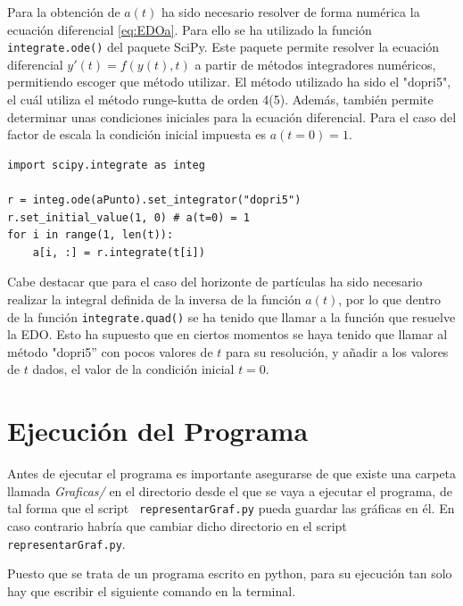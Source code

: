 \documentclass[twoside]{article}
\begin{document}
	    		Para la obtención de $a(t)$ ha sido necesario resolver de forma numérica la ecuación diferencial \ref{eq:EDOa}. Para ello se ha utilizado la función \texttt{integrate.ode()} del paquete SciPy. Este paquete permite resolver la ecuación diferencial $y'(t) = f(y(t), t)$ a partir de métodos integradores numéricos, permitiendo escoger que método utilizar. El método utilizado ha sido el "dopri5", el cuál utiliza el método runge-kutta de orden 4(5). Además, también permite determinar unas condiciones iniciales para la ecuación diferencial. Para el caso del factor de escala la condición inicial impuesta es $a(t=0) = 1$.

	    		\begin{lstlisting}[style=python]
import scipy.integrate as integ

r = integ.ode(aPunto).set_integrator("dopri5")
r.set_initial_value(1, 0) # a(t=0) = 1
for i in range(1, len(t)):
	a[i, :] = r.integrate(t[i])
				\end{lstlisting}

				Cabe destacar que para el caso del horizonte de partículas ha sido necesario realizar la integral definida de la inversa de la función $a(t)$, por lo que dentro de la función \texttt{integrate.quad()} se ha tenido que llamar a la función que resuelve la EDO. Esto ha supuesto que en ciertos momentos se haya tenido que llamar al método "dopri5'' con pocos valores de $t$ para su resolución, y añadir a los valores de $t$ dados, el valor de la condición inicial $t = 0$.

			\section{Ejecución del Programa}

				Antes de ejecutar el programa es importante asegurarse de que existe una carpeta llamada \textit{Graficas/} en el directorio desde el que se vaya a ejecutar el programa, de tal forma que el script \texttt{ representarGraf.py} pueda guardar las gráficas en él. En caso contrario habría que cambiar dicho directorio en el script \texttt{ representarGraf.py}.

				Puesto que se trata de un programa escrito en python, para su ejecución tan solo hay que escribir el siguiente comando en la terminal.

				\begin{center}
					\begin{minipage}[c]{200pt}
					\end{minipage}
				\end{center}
\end{document}

